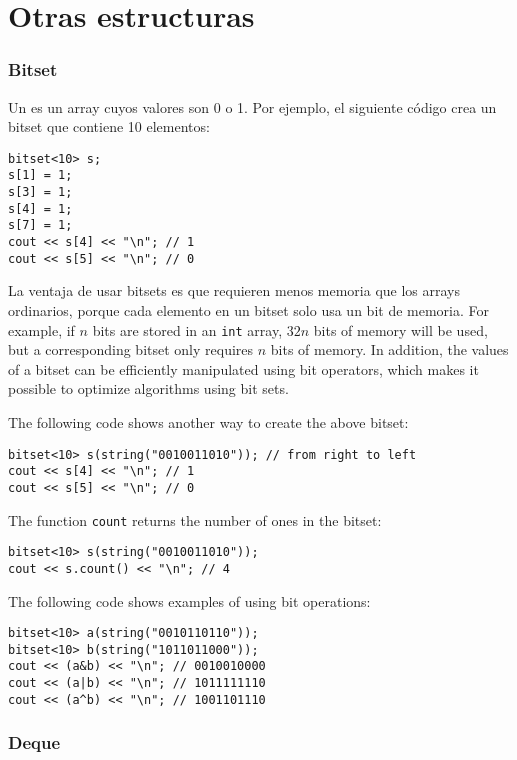 \section{Otras estructuras}

\subsubsection{Bitset}


Un  es un array
cuyos valores son 0 o 1.
Por ejemplo, el siguiente código crea
un bitset que contiene 10 elementos:
\begin{lstlisting}
bitset<10> s;
s[1] = 1;
s[3] = 1;
s[4] = 1;
s[7] = 1;
cout << s[4] << "\n"; // 1
cout << s[5] << "\n"; // 0
\end{lstlisting}

La ventaja de usar bitsets es que
requieren menos memoria que los arrays ordinarios,
porque cada elemento en un bitset solo
usa un bit de memoria.
For example, 
if $n$ bits are stored in an \texttt{int} array,
$32n$ bits of memory will be used,
but a corresponding bitset only requires $n$ bits of memory.
In addition, the values of a bitset
can be efficiently manipulated using
bit operators, which makes it possible to
optimize algorithms using bit sets.

The following code shows another way to create the above bitset:
\begin{lstlisting}
bitset<10> s(string("0010011010")); // from right to left
cout << s[4] << "\n"; // 1
cout << s[5] << "\n"; // 0
\end{lstlisting}

The function \texttt{count} returns the number
of ones in the bitset:

\begin{lstlisting}
bitset<10> s(string("0010011010"));
cout << s.count() << "\n"; // 4
\end{lstlisting}

The following code shows examples of using bit operations:
\begin{lstlisting}
bitset<10> a(string("0010110110"));
bitset<10> b(string("1011011000"));
cout << (a&b) << "\n"; // 0010010000
cout << (a|b) << "\n"; // 1011111110
cout << (a^b) << "\n"; // 1001101110
\end{lstlisting}

\subsubsection{Deque}

